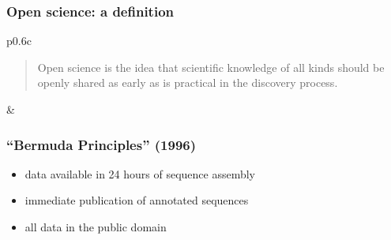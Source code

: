 \begin{frame}\frametitle{Open science: a definition}
\centering
\begin{tabular}{p{0.6\textwidth}c}
	\begin{minipage}{\linewidth}
	\begin{quote}
		\begin{fancyquote}
		Open science is the idea that scientific knowledge of all kinds
		should be openly shared as early as is practical in the discovery
		process.
		\end{fancyquote}
	\end{quote}
	\end{minipage}
	&
\end{tabular}
\end{frame}

\begin{frame}\frametitle{``Bermuda Principles'' (1996)}
	\begin{itemize}
		\item data available in 24 hours of sequence assembly
		\item immediate publication of annotated sequences
		\item all data in the public domain
	\end{itemize}
\end{frame}

